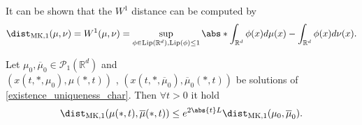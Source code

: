 \begin{remark}
 It can be shown that the $W^{1} $  distance can be computed by
 \begin{align*}
   \dist_{\text{MK},1}(\mu ,\nu ) = W^{1}(\mu ,\nu )  = \sup_{\phi \in \text{Lip}(\mathbb{R}^{d} ),\text{Lip}(\phi )\le 1} \abs*{\int_{\mathbb{R}^{d} } \phi(x) d\mu (x) - \int_{\mathbb{R}^{d} }\phi(x) d\nu(x)}
 .\end{align*}
\end{remark}
\begin{theorem}\label{dobrushin_stability}
  Let $\mu_0,\overline{\mu }_0 \in  \mathcal{P}_1(\mathbb{R}^{d} ) $  and\\
  $(x(t,*,\mu_0),\mu(*,t))$ , $(x(t,*,\overline{\mu}_0),\overline{\mu}_0 (*,t))$ be solutions of 
  \autoref{existence_uniqueness_char}. Then $\forall t >0$ it hold 
  \begin{align*}
    \dist_{\text{MK},1}(\mu(*,t),\overline{\mu }(*,t) ) \le e^{2 \abs{t} L} \dist_{\text{MK},1} (\mu_0,\overline{\mu }_0 )
  .\end{align*}
\end{theorem}
